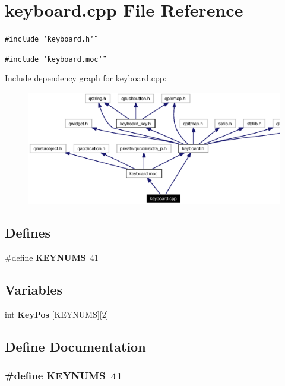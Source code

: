 \section{keyboard.cpp File Reference}
\label{keyboard_8cpp}


{\tt \#include \char`\"{}keyboard.h\char`\"{}}\par
{\tt \#include \char`\"{}keyboard.moc\char`\"{}}\par


Include dependency graph for keyboard.cpp:\begin{figure}[H]
\begin{center}
\leavevmode
\includegraphics[width=351pt]{keyboard_8cpp__incl}
\end{center}
\end{figure}
\subsection*{Defines}
\begin{CompactItemize}
\item 
\#define {\bf KEYNUMS}\ 41
\end{CompactItemize}
\subsection*{Variables}
\begin{CompactItemize}
\item 
int {\bf Key\-Pos} [KEYNUMS][2]
\end{CompactItemize}


\subsection{Define Documentation}
\subsubsection{\setlength{\rightskip}{0pt plus 5cm}\#define KEYNUMS\ 41}\label{keyboard_8cpp_a0}




